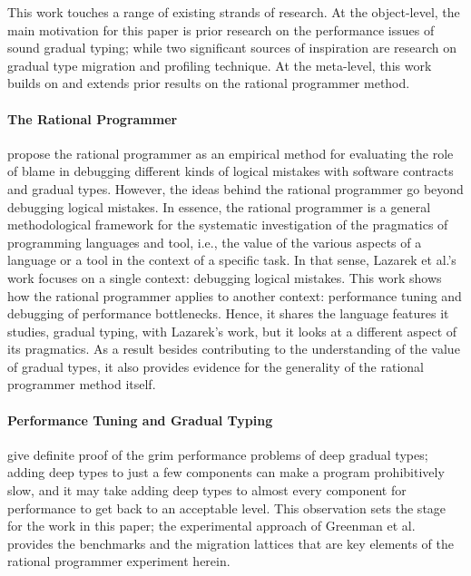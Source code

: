 


This work touches a range of existing strands of research. At
the object-level, the main motivation for this paper is prior research on
the performance issues of sound gradual typing; while two significant
sources of inspiration are research on gradual type migration and
profiling technique.  At the meta-level, this work builds on and extends
prior results on the rational programmer method.   

\paragraph{The Rational Programmer}

 \citet{lksfd-popl-2020,lgfd-icfp-2021} propose the rational programmer as
 an empirical method for evaluating the role of blame in debugging
 different kinds of logical mistakes with software contracts and gradual types. However,
 the ideas behind the rational programmer go beyond debugging logical
 mistakes. In essence, the rational programmer is a general methodological
 framework for the systematic investigation of the pragmatics of
 programming languages and tool, i.e., the value of the various aspects of a
 language or a tool in the context of a specific task. In that sense,
 Lazarek et al.'s work focuses on a single context: debugging logical
 mistakes. This work shows how the rational programmer applies to
 another context: performance tuning and debugging of performance
 bottlenecks. Hence, it shares the language features
 it studies, gradual typing, with Lazarek's work, but it looks at a different aspect of its
 pragmatics. As a result besides contributing to the understanding of the
 value of gradual types, it also provides evidence for the generality of
 the rational programmer method itself.  

\paragraph{Performance Tuning and Gradual Typing} 

\citet{gtnffvf-jfp-2019} give definite proof of
the grim performance problems of deep
gradual types; adding deep types to just a few components 
can make a program prohibitively slow, and it may take
adding deep types to almost every component for performance to get back to
an acceptable level. This observation sets the stage for the work in this
paper; the experimental approach of Greenman et al. provides
the benchmarks and the migration lattices that are key elements of the
rational programmer experiment herein.  

